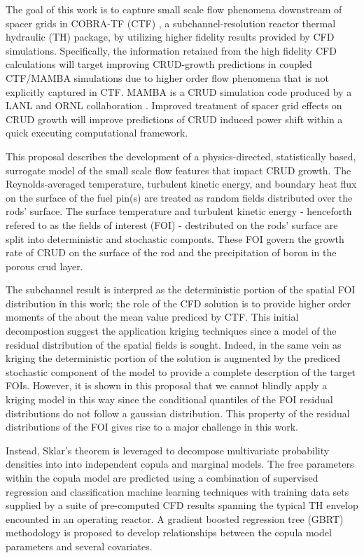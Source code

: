 The goal of this work is to capture small scale flow phenomena downstream of spacer grids
in COBRA-TF (CTF) \cite{salko12}, a subchannel-resolution reactor thermal hydraulic (TH) package, by utilizing higher fidelity results provided by CFD simulations.  Specifically, the information retained from the high fidelity CFD calculations will target
 improving CRUD-growth predictions in coupled CTF/MAMBA
simulations due to higher order flow phenomena that is not explicitly captured in CTF.  MAMBA
is a CRUD simulation code produced by a LANL and ORNL collaboration \cite{collins16}.  Improved treatment of spacer grid effects on CRUD growth will improve predictions of CRUD induced
power shift within a quick executing computational framework.

This proposal describes the development of a physics-directed, statistically
based, surrogate model of the small scale flow features that impact CRUD growth.
The Reynolds-averaged temperature,
turbulent kinetic energy, and boundary heat flux on the surface of the fuel pin(s) are treated
as random fields distributed over the rods' surface. 
The surface temperature and turbulent kinetic energy - henceforth refered to as the fields of interest (FOI) - destributed on the rods' surface are split into deterministic and stochastic componts.  These FOI govern the growth rate of CRUD on the surface of the rod and the precipitation of boron in the porous crud layer.

The subchannel result is interpred as the deterministic portion of the
spatial FOI distribution in this work; the role of the CFD solution is to provide higher order
moments of the about the mean value prediced by CTF.
This initial decompostion suggest the application kriging techniques since a model
of the residual distribution of
the spatial fields is sought.  Indeed, in the same vein as kriging the deterministic portion of the solution is augmented by the
prediced stochastic component of the model to provide a complete descrption of the target FOIs.
However, it is shown in this proposal that we cannot blindly apply a kriging model in this way since the
conditional quantiles of the FOI residual distributions do not follow a gaussian distribution.
This property of the residual distributions of the FOI gives rise to a major challenge
in this work.

Instead, Sklar's theorem is leveraged
to decompose multivariate probability densities into into independent copula
and marginal models. The free parameters within the copula model are predicted using a combination of supervised regression and classification machine learning techniques with training
data sets supplied by a suite of pre-computed CFD results spanning the typical TH envelop encounted in an operating reactor. A gradient boosted regression tree (GBRT) methodology is proposed to develop relationships between the copula model parameters and several covariates.


